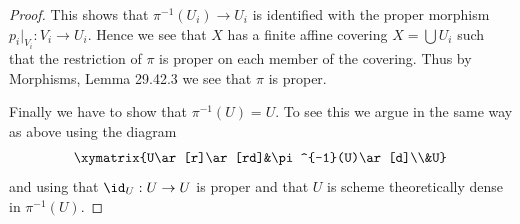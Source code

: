 \begin{proof}
This shows that $\pi^{-1}(U_i)\to U_i$ is identified with the proper morphism $p_i|_{V_i}:V_i\to U_i$. Hence we see that $X$ has a finite affine covering $X=\bigcup U_i$ such that the restriction of $\pi$ is proper on each member of the covering. Thus by Morphisms, Lemma 29.42.3 we see that $\pi$ is proper.

Finally we have to show that $\pi^{-1}(U)=U$. To see this we argue in the same way as above using the diagram
\[\xymatrix{U\ar[r]\ar[rd]&\pi^{-1}(U)\ar[d]\\&U}\]
and using that $\id_U:U\to U$ is proper and that $U$ is scheme theoretically dense in $\pi^{-1}(U)$.
\end{proof}

